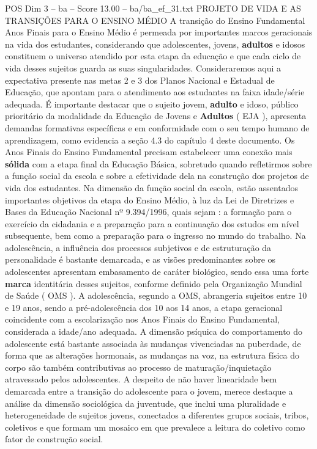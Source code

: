 \begin{textsample}{POS Dim 3 – ba – Score 13.00 – ba/ba\_ef\_31.txt}  \label{ex:f3_pos_179}
PROJETO DE VIDA E AS TRANSIÇÕES PARA O ENSINO MÉDIO A transição do Ensino Fundamental Anos Finais para o Ensino Médio é permeada por importantes marcos geracionais na vida dos estudantes, considerando que adolescentes, jovens, \textbf{adultos} e idosos constituem o universo atendido por esta etapa da educação e que cada ciclo de vida desses sujeitos guarda as suas singularidades.
Consideraremos aqui a expectativa presente nas metas 2 e 3 dos Planos Nacional e Estadual de Educação, que apontam para o atendimento aos estudantes na faixa idade/série adequada.
É importante destacar que o sujeito jovem, \textbf{adulto} e idoso, público prioritário da modalidade da Educação de Jovens e \textbf{Adultos} ( EJA ), apresenta demandas formativas específicas e em conformidade com o seu tempo humano de aprendizagem, como evidencia a seção 4.3 do capítulo 4 deste documento.
Os Anos Finais do Ensino Fundamental precisam estabelecer uma conexão mais \textbf{sólida} com a etapa final da Educação Básica, sobretudo quando refletirmos sobre a função social da escola e sobre a efetividade dela na construção dos projetos de vida dos estudantes.
Na dimensão da função social da escola, estão assentados importantes objetivos da etapa do Ensino Médio, à luz da Lei de Diretrizes e Bases da Educação Nacional nº 9.394/1996, quais sejam : a formação para o exercício da cidadania e a preparação para a continuação dos estudos em nível subsequente, bem como a preparação para o ingresso no mundo do trabalho.
Na adolescência, a influência dos processos subjetivos e de estruturação da personalidade é bastante demarcada, e as visões predominantes sobre os adolescentes apresentam embasamento de caráter biológico, sendo essa uma forte \textbf{marca} identitária desses sujeitos, conforme definido pela Organização Mundial de Saúde ( OMS ).
A adolescência, segundo a OMS, abrangeria sujeitos entre 10 e 19 anos, sendo a pré-adolescência dos 10 aos 14 anos, a etapa geracional coincidente com a escolarização nos Anos Finais do Ensino Fundamental, considerada a idade/ano adequada.
A dimensão psíquica do comportamento do adolescente está bastante associada às mudanças vivenciadas na puberdade, de forma que as alterações hormonais, as mudanças na voz, na estrutura física do corpo são também contributivas ao processo de maturação/inquietação atravessado pelos adolescentes.
A despeito de não haver linearidade bem demarcada entre a transição do adolescente para o jovem, merece destaque a análise da dimensão sociológica da juventude, que inclui uma pluralidade e heterogeneidade de sujeitos jovens, conectados a diferentes grupos sociais, tribos, coletivos e que formam um mosaico em que prevalece a leitura do coletivo como fator de construção social.

\end{textsample}

